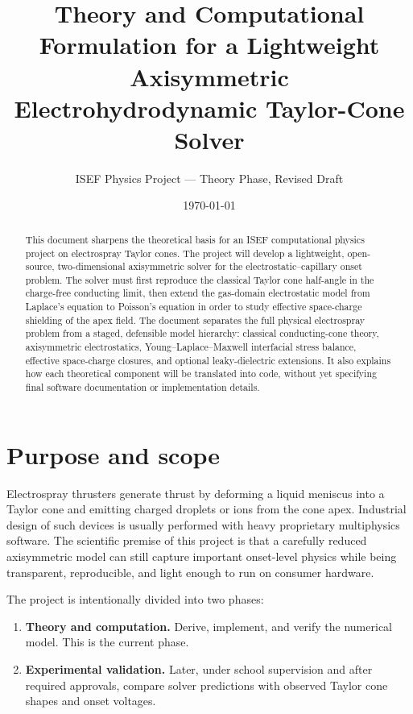 \documentclass[11pt]{article}
\title{Theory and Computational Formulation for a Lightweight Axisymmetric Electrohydrodynamic Taylor-Cone Solver}
\author{ISEF Physics Project --- Theory Phase, Revised Draft}
\date{\today}
\begin{document}
\maketitle

\begin{abstract}
This document sharpens the theoretical basis for an ISEF computational physics project on electrospray Taylor cones. The project will develop a lightweight, open-source, two-dimensional axisymmetric solver for the electrostatic--capillary onset problem. The solver must first reproduce the classical Taylor cone half-angle in the charge-free conducting limit, then extend the gas-domain electrostatic model from Laplace's equation to Poisson's equation in order to study effective space-charge shielding of the apex field. The document separates the full physical electrospray problem from a staged, defensible model hierarchy: classical conducting-cone theory, axisymmetric electrostatics, Young--Laplace--Maxwell interfacial stress balance, effective space-charge closures, and optional leaky-dielectric extensions. It also explains how each theoretical component will be translated into code, without yet specifying final software documentation or implementation details.
\end{abstract}

\tableofcontents

\section{Purpose and scope}

Electrospray thrusters generate thrust by deforming a liquid meniscus into a Taylor cone and emitting charged droplets or ions from the cone apex. Industrial design of such devices is usually performed with heavy proprietary multiphysics software. The scientific premise of this project is that a carefully reduced axisymmetric model can still capture important onset-level physics while being transparent, reproducible, and light enough to run on consumer hardware.

The project is intentionally divided into two phases:
\begin{enumerate}[label=\textbf{Phase \arabic*:}]
    \item \textbf{Theory and computation.} Derive, implement, and verify the numerical model. This is the current phase.
    \item \textbf{Experimental validation.} Later, under school supervision and after required approvals, compare solver predictions with observed Taylor cone shapes and onset voltages.
\end{enumerate}
\end{document}
